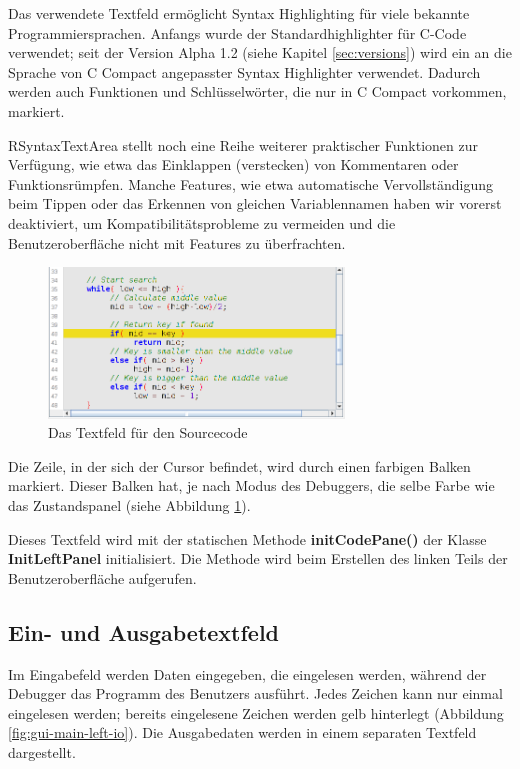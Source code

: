Das verwendete Textfeld ermöglicht Syntax Highlighting für viele bekannte Programmiersprachen. Anfangs wurde der Standardhighlighter für C-Code verwendet; seit der Version Alpha 1.2 (siehe Kapitel \ref{sec:versions}) wird ein an die Sprache von C Compact angepasster Syntax Highlighter verwendet. Dadurch werden auch Funktionen und Schlüsselwörter, die nur in C Compact vorkommen, markiert.

RSyntaxTextArea stellt noch eine Reihe weiterer praktischer Funktionen zur Verfügung, wie etwa das Einklappen (verstecken) von Kommentaren oder Funktionsrümpfen. Manche Features, wie etwa automatische Vervollständigung beim Tippen oder das Erkennen von gleichen Variablennamen haben wir vorerst deaktiviert, um Kompatibilitätsprobleme zu vermeiden und die Benutzeroberfläche nicht mit Features zu überfrachten.

\begin{figure}[h!] 
  \centering
     \includegraphics[width=0.7\textwidth]{./media/images/gui/main/CCompact-gui-left-code-2.png}
  \caption{Das Textfeld für den Sourcecode}
  \label{fig:gui-main-left-code}
\end{figure}

Die Zeile, in der sich der Cursor befindet, wird durch einen farbigen Balken markiert. Dieser Balken hat, je nach Modus des Debuggers, die selbe Farbe wie das Zustandspanel (siehe Abbildung \ref{fig:gui-main-left-code}).

Dieses Textfeld wird mit der statischen Methode \textbf{initCodePane()} der Klasse \textbf{InitLeftPanel} initialisiert. Die Methode wird beim Erstellen des linken Teils der Benutzeroberfläche aufgerufen.

\subsection{Ein- und Ausgabetextfeld}
\label{sec:gui-main-left-io}

Im Eingabefeld werden Daten eingegeben, die eingelesen werden, während der Debugger das Programm des Benutzers ausführt. Jedes Zeichen kann nur einmal eingelesen werden; bereits eingelesene Zeichen werden gelb hinterlegt (Abbildung \ref{fig:gui-main-left-io}). Die Ausgabedaten werden in einem separaten Textfeld dargestellt.

